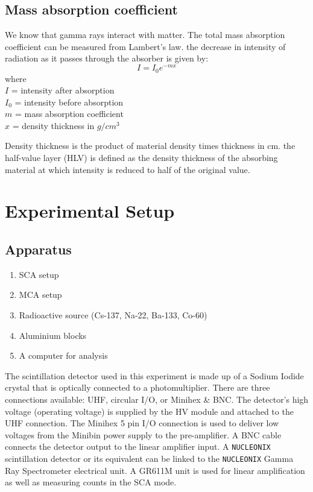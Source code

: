 \subsection{Mass absorption coefficient}
    We know that gamma rays interact with matter. The total mass absorption coefficient can be measured from Lambert's law. the decrease in intensity of radiation as it passes through the absorber is given by:
    $$I=I_0e^{-mx}$$
    where \\
    $I$ = intensity after absorption\\
    $I_0$ = intensity before absorption\\
    $m$ = mass absorption coefficient\\
    $x$ = density thickness in $g/cm^3$

    Density thickness is the product of material density times thickness in cm. the half-value layer (HLV) is defined as the density thickness of the absorbing material at which intensity is reduced to half of the original value.

\section{Experimental Setup}

\subsection*{Apparatus}

\begin{enumerate}
    \item SCA setup
    \item MCA setup
    \item Radioactive source (Cs-137, Na-22, Ba-133, Co-60)
    \item Aluminium blocks
    \item A computer for analysis\\
\end{enumerate}


The scintillation detector used in this experiment is made up of a Sodium Iodide crystal that is optically connected to a photomultiplier. There are three connections available: UHF, circular I/O, or Minihex \& BNC. The detector's high voltage (operating voltage) is supplied by the HV module and attached to the UHF connection. The Minihex 5 pin I/O connection is used to deliver low voltages from the Minibin power supply to the pre-amplifier. A BNC cable connects the detector output to the linear amplifier input. A \verb|NUCLEONIX| scintillation detector or its equivalent can be linked to the \verb|NUCLEONIX| Gamma Ray Spectrometer electrical unit. A GR611M unit is used for linear amplification as well as measuring counts in the SCA mode.